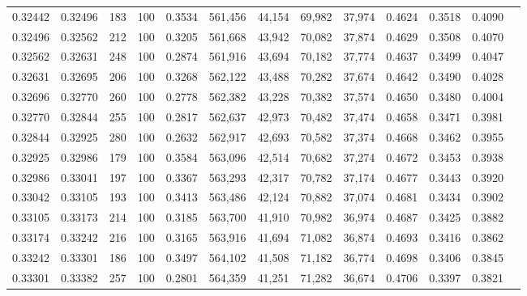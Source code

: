 \begin{tabular}{rrrrrrrrrrrrr}
0.32442 & 0.32496 &   183 & 100 &                                     0.3534 & 561,456 &  44,154 &  69,982 &  37,974 & 0.4624 & 0.3518 & 0.4090 \\
0.32496 & 0.32562 &   212 & 100 &                                     0.3205 & 561,668 &  43,942 &  70,082 &  37,874 & 0.4629 & 0.3508 & 0.4070 \\
0.32562 & 0.32631 &   248 & 100 &                                     0.2874 & 561,916 &  43,694 &  70,182 &  37,774 & 0.4637 & 0.3499 & 0.4047 \\
0.32631 & 0.32695 &   206 & 100 &                                     0.3268 & 562,122 &  43,488 &  70,282 &  37,674 & 0.4642 & 0.3490 & 0.4028 \\
0.32696 & 0.32770 &   260 & 100 &                                     0.2778 & 562,382 &  43,228 &  70,382 &  37,574 & 0.4650 & 0.3480 & 0.4004 \\
0.32770 & 0.32844 &   255 & 100 &                                     0.2817 & 562,637 &  42,973 &  70,482 &  37,474 & 0.4658 & 0.3471 & 0.3981 \\
0.32844 & 0.32925 &   280 & 100 &                                     0.2632 & 562,917 &  42,693 &  70,582 &  37,374 & 0.4668 & 0.3462 & 0.3955 \\
0.32925 & 0.32986 &   179 & 100 &                                     0.3584 & 563,096 &  42,514 &  70,682 &  37,274 & 0.4672 & 0.3453 & 0.3938 \\
0.32986 & 0.33041 &   197 & 100 &                                     0.3367 & 563,293 &  42,317 &  70,782 &  37,174 & 0.4677 & 0.3443 & 0.3920 \\
0.33042 & 0.33105 &   193 & 100 &                                     0.3413 & 563,486 &  42,124 &  70,882 &  37,074 & 0.4681 & 0.3434 & 0.3902 \\
0.33105 & 0.33173 &   214 & 100 &                                     0.3185 & 563,700 &  41,910 &  70,982 &  36,974 & 0.4687 & 0.3425 & 0.3882 \\
0.33174 & 0.33242 &   216 & 100 &                                     0.3165 & 563,916 &  41,694 &  71,082 &  36,874 & 0.4693 & 0.3416 & 0.3862 \\
0.33242 & 0.33301 &   186 & 100 &                                     0.3497 & 564,102 &  41,508 &  71,182 &  36,774 & 0.4698 & 0.3406 & 0.3845 \\
0.33301 & 0.33382 &   257 & 100 &                                     0.2801 & 564,359 &  41,251 &  71,282 &  36,674 & 0.4706 & 0.3397 & 0.3821 \\

\end{tabular}
